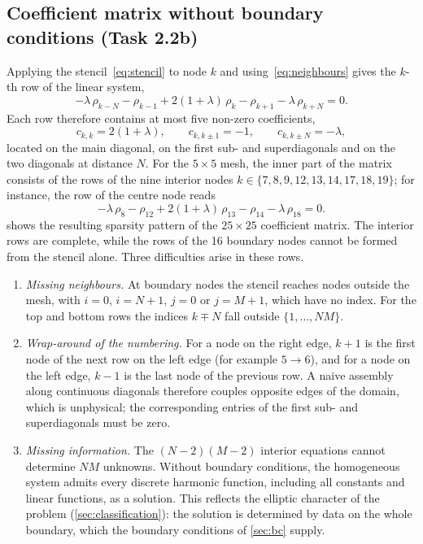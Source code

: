 \documentclass[11pt,a4paper]{article}
\numberwithin{equation}{section}
\theoremstyle{definition}
\theoremstyle{remark}
\begin{document}
\subsection{Coefficient matrix without boundary conditions (Task 2.2b)}\label{sec:inner}

Applying the stencil~\eqref{eq:stencil} to node $k$ and using~\eqref{eq:neighbours}
gives the $k$-th row of the linear system,
\begin{equation}\label{eq:row}
  -\lambda\,\rho_{k-N} - \rho_{k-1} + 2(1 + \lambda)\,\rho_k - \rho_{k+1}
  - \lambda\,\rho_{k+N} = 0.
\end{equation}
Each row therefore contains at most five non-zero coefficients,
\begin{equation}\label{eq:coefficients}
  c_{k,k} = 2(1 + \lambda),
  \qquad
  c_{k,k\pm1} = -1,
  \qquad
  c_{k,k\pm N} = -\lambda,
\end{equation}
located on the main diagonal, on the first sub- and superdiagonals and on the two
diagonals at distance $N$. For the $5\times5$ mesh, the inner part of the matrix consists of
the rows of the nine interior nodes $k \in \{7, 8, 9, 12, 13, 14, 17, 18, 19\}$; for
instance, the row of the centre node reads
\begin{equation}\label{eq:row13}
  -\lambda\,\rho_{8} - \rho_{12} + 2(1 + \lambda)\,\rho_{13} - \rho_{14}
  - \lambda\,\rho_{18} = 0.
\end{equation}
 shows the resulting sparsity pattern of the $25 \times 25$
coefficient matrix. The interior rows are complete, while the rows of the 16 boundary
nodes cannot be formed from the stencil alone. Three difficulties arise in these rows.
\begin{enumerate}
  \item \emph{Missing neighbours.} At boundary nodes the stencil reaches nodes outside the
    mesh, with $i = 0$, $i = N + 1$, $j = 0$ or $j = M + 1$, which have no index. For the
    top and bottom rows the indices $k \mp N$ fall outside $\{1, \dots, NM\}$.
  \item \emph{Wrap-around of the numbering.} For a node on the right edge, $k + 1$ is the
    first node of the next row on the left edge (for example $5 \to 6$), and for a node
    on the left edge, $k - 1$ is the last node of the previous row. A naive assembly
    along continuous diagonals therefore couples opposite edges of the domain, which is
    unphysical; the corresponding entries of the first sub- and superdiagonals must be
    zero.
  \item \emph{Missing information.} The $(N - 2)(M - 2)$ interior equations cannot
    determine $NM$ unknowns. Without boundary conditions, the homogeneous system admits
    every discrete harmonic function, including all constants and linear functions, as a
    solution. This reflects the elliptic character of the problem
    (\cref{sec:classification}): the solution is determined by data on the whole
    boundary, which the boundary conditions of \cref{sec:bc} supply.
\end{enumerate}
\end{document}
